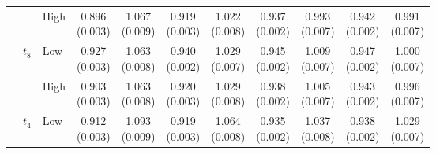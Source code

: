 \begin{table}[!t]
\begin{tabular}{lllcccccccc}
 &  & High & \shortstack{0.896\\[-1pt]\scriptsize(0.003)} & \shortstack{1.067\\[-1pt]\scriptsize(0.009)} & \shortstack{0.919\\[-1pt]\scriptsize(0.003)} & \shortstack{1.022\\[-1pt]\scriptsize(0.008)} & \shortstack{0.937\\[-1pt]\scriptsize(0.002)} & \shortstack{0.993\\[-1pt]\scriptsize(0.007)} & \shortstack{0.942\\[-1pt]\scriptsize(0.002)} & \shortstack{0.991\\[-1pt]\scriptsize(0.007)}\\
\addlinespace[1pt]
 & $t_8$ & Low & \shortstack{0.927\\[-1pt]\scriptsize(0.003)} & \shortstack{1.063\\[-1pt]\scriptsize(0.008)} & \shortstack{0.940\\[-1pt]\scriptsize(0.002)} & \shortstack{1.029\\[-1pt]\scriptsize(0.007)} & \shortstack{0.945\\[-1pt]\scriptsize(0.002)} & \shortstack{1.009\\[-1pt]\scriptsize(0.007)} & \shortstack{0.947\\[-1pt]\scriptsize(0.002)} & \shortstack{1.000\\[-1pt]\scriptsize(0.007)}\\
 &  & High & \shortstack{0.903\\[-1pt]\scriptsize(0.003)} & \shortstack{1.063\\[-1pt]\scriptsize(0.008)} & \shortstack{0.920\\[-1pt]\scriptsize(0.003)} & \shortstack{1.029\\[-1pt]\scriptsize(0.008)} & \shortstack{0.938\\[-1pt]\scriptsize(0.002)} & \shortstack{1.005\\[-1pt]\scriptsize(0.007)} & \shortstack{0.943\\[-1pt]\scriptsize(0.002)} & \shortstack{0.996\\[-1pt]\scriptsize(0.007)}\\
\addlinespace[1pt]
 & $t_4$ & Low & \shortstack{0.912\\[-1pt]\scriptsize(0.003)} & \shortstack{1.093\\[-1pt]\scriptsize(0.009)} & \shortstack{0.919\\[-1pt]\scriptsize(0.003)} & \shortstack{1.064\\[-1pt]\scriptsize(0.008)} & \shortstack{0.935\\[-1pt]\scriptsize(0.002)} & \shortstack{1.037\\[-1pt]\scriptsize(0.008)} & \shortstack{0.938\\[-1pt]\scriptsize(0.002)} & \shortstack{1.029\\[-1pt]\scriptsize(0.007)}\\

\end{tabular}
\end{table}
